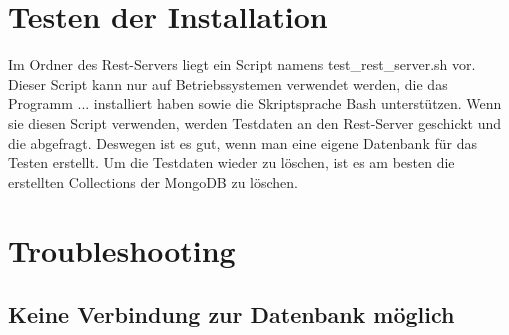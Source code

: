 \documentclass[12pt]{scrartcl}
\begin{document}
    \section{Testen der Installation}
        Im Ordner des Rest-Servers liegt ein Script namens test_rest_server.sh vor.
        Dieser Script kann nur auf Betriebssystemen verwendet werden, die das Programm ... installiert haben sowie die Skriptsprache Bash unterstützen.
        Wenn sie diesen Script verwenden, werden Testdaten an den Rest-Server geschickt und die abgefragt.
        Deswegen ist es gut, wenn man eine eigene Datenbank für das Testen erstellt.
        Um die Testdaten wieder zu löschen, ist es am besten die erstellten Collections der MongoDB zu löschen.

    \section{Troubleshooting}
        \subsection{Keine Verbindung zur Datenbank möglich}

\end{document}
